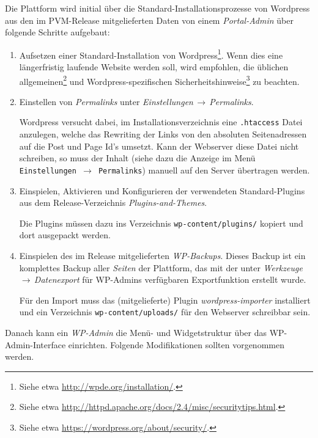 \documentclass[11pt,a4paper]{article}
\begin{document}
Die Plattform wird initial über die Standard-Installationsprozesse von
Wordpress aus den im PVM-Release mitgelieferten Daten von einem
\emph{Portal-Admin} über folgende Schritte aufgebaut:
\begin{enumerate}
\item Aufsetzen einer Standard-Installation von Wordpress\footnote{Siehe etwa
  \url{http://wpde.org/installation/}. }. Wenn dies eine längerfristig laufende
  Website werden soll, wird empfohlen, die üblichen allgemeinen\footnote{Siehe
    etwa \url{http://httpd.apache.org/docs/2.4/misc/securitytips.html}.  } und
  Wordpress-spezifischen Sicherheitshinweise\footnote{Siehe etwa
    \url{https://wordpress.org/about/security/}.  } zu beachten.
\item Einstellen von \emph{Permalinks} unter
  \emph{Einstellungen\,$\to$\,Permalinks}.

Wordpress versucht dabei, im Installationsverzeichnis eine \texttt{.htaccess}
Datei anzulegen, welche das Rewriting der Links von den absoluten
Seitenadressen auf die Post und Page Id's umsetzt. Kann der Webserver diese
Datei nicht schreiben, so muss der Inhalt (siehe dazu die Anzeige im Menü
\texttt{Einstellungen\,$\to$\,Permalinks}) manuell auf den Server übertragen
werden.

\item Einspielen, Aktivieren und Konfigurieren der verwendeten
  Standard-Plugins aus dem Release-Verzeichnis \emph{Plugins-and-Themes}.

Die Plugins müssen dazu ins Verzeichnis \texttt{wp-content/plugins/} kopiert
und dort ausgepackt werden.

\item Einspielen des im Release mitgelieferten \emph{WP-Backups}. Dieses
  Backup ist ein komplettes Backup aller \emph{Seiten} der Plattform, das mit
  der unter \emph{Werkzeuge\,$\to$\,Datenexport} für WP-Admins verfügbaren
  Exportfunktion erstellt wurde.

Für den Import muss das (mitgelieferte) Plugin \emph{wordpress-importer}
installiert und ein Verzeichnis \texttt{wp-content/uploads/} für den Webserver
schreibbar sein.

\end{enumerate}
Danach kann ein \emph{WP-Admin} die Menü- und Widgetstruktur über das
WP-Admin-Interface einrichten. Folgende Modifikationen sollten vorgenommen
werden.
\end{document}
